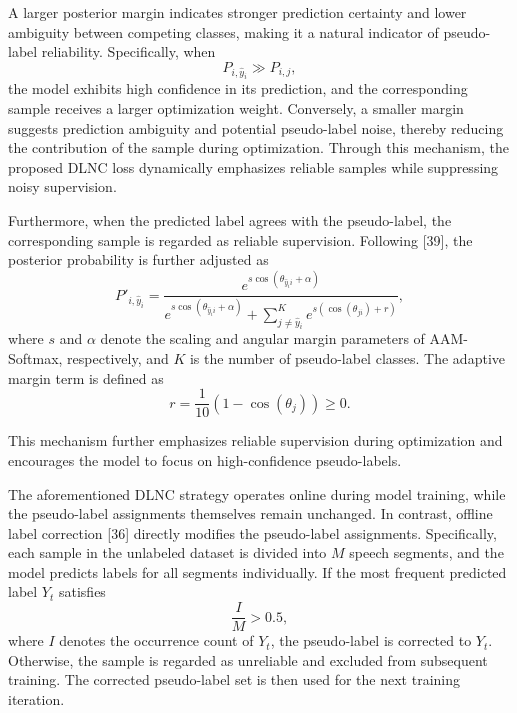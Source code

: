 \documentclass[lettersize,journal]{IEEEtran}
\begin{document}
A larger posterior margin indicates stronger prediction certainty and lower ambiguity between competing classes, making it a natural indicator of pseudo-label reliability. Specifically, when
\begin{equation}
P_{i,\hat{y}_i}
\gg
P_{i,j},
\end{equation}
the model exhibits high confidence in its prediction, and the corresponding sample receives a larger optimization weight. Conversely, a smaller margin suggests prediction ambiguity and potential pseudo-label noise, thereby reducing the contribution of the sample during optimization. Through this mechanism, the proposed DLNC loss dynamically emphasizes reliable samples while suppressing noisy supervision.

Furthermore, when the predicted label agrees with the pseudo-label, the corresponding sample is regarded as reliable supervision. Following [39], the posterior probability is further adjusted as
\begin{equation}
P'_{i,\hat{y}_i}
=
\frac{
e^{s\cos(\theta_{\hat{y}_ii}+\alpha)}
}{
e^{s\cos(\theta_{\hat{y}_ii}+\alpha)}
+
\sum_{j\neq \hat{y}_i}^{K}
e^{s(\cos(\theta_{ji})+r)}
},
\end{equation}
where $s$ and $\alpha$ denote the scaling and angular margin parameters of AAM-Softmax, respectively, and $K$ is the number of pseudo-label classes. The adaptive margin term is defined as
\begin{equation}
r
=
\frac{1}{10}
\left(
1-\cos(\theta_j)
\right)
\geq 0.
\end{equation}

This mechanism further emphasizes reliable supervision during optimization and encourages the model to focus on high-confidence pseudo-labels.

The aforementioned DLNC strategy operates online during model training, while the pseudo-label assignments themselves remain unchanged. In contrast, offline label correction [36] directly modifies the pseudo-label assignments. Specifically, each sample in the unlabeled dataset is divided into $M$ speech segments, and the model predicts labels for all segments individually. If the most frequent predicted label $Y_t$ satisfies
\begin{equation}
\frac{I}{M}>0.5,
\end{equation}
where $I$ denotes the occurrence count of $Y_t$, the pseudo-label is corrected to $Y_t$. Otherwise, the sample is regarded as unreliable and excluded from subsequent training. The corrected pseudo-label set is then used for the next training iteration.
\end{document}
